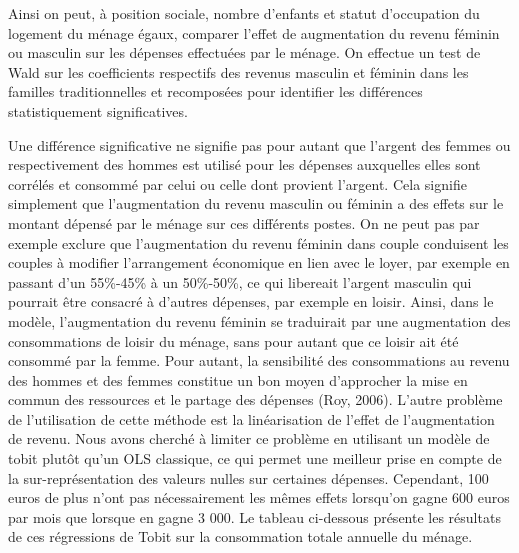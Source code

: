 \documentclass[
  12pt,
]{book}
\begin{document}
Ainsi on peut, à position sociale, nombre d'enfants et statut
d'occupation du logement du ménage égaux, comparer l'effet de
augmentation du revenu féminin ou masculin sur les dépenses effectuées
par le ménage. On effectue un test de Wald sur les coefficients
respectifs des revenus masculin et féminin dans les familles
traditionnelles et recomposées pour identifier les différences
statistiquement significatives.

Une différence significative ne signifie pas pour autant que l'argent
des femmes ou respectivement des hommes est utilisé pour les dépenses
auxquelles elles sont corrélés et consommé par celui ou celle dont
provient l'argent. Cela signifie simplement que l'augmentation du revenu
masculin ou féminin a des effets sur le montant dépensé par le ménage
sur ces différents postes. On ne peut pas par exemple exclure que
l'augmentation du revenu féminin dans couple conduisent les couples à
modifier l'arrangement économique en lien avec le loyer, par exemple en
passant d'un 55\%-45\% à un 50\%-50\%, ce qui libereait l'argent
masculin qui pourrait être consacré à d'autres dépenses, par exemple en
loisir. Ainsi, dans le modèle, l'augmentation du revenu féminin se
traduirait par une augmentation des consommations de loisir du ménage,
sans pour autant que ce loisir ait été consommé par la femme. Pour
autant, la sensibilité des consommations au revenu des hommes et des
femmes constitue un bon moyen d'approcher la mise en commun des
ressources et le partage des dépenses (Roy, 2006). L'autre problème de
l'utilisation de cette méthode est la linéarisation de l'effet de
l'augmentation de revenu. Nous avons cherché à limiter ce problème en
utilisant un modèle de tobit plutôt qu'un OLS classique, ce qui permet
une meilleur prise en compte de la sur-représentation des valeurs nulles
sur certaines dépenses. Cependant, 100 euros de plus n'ont pas
nécessairement les mêmes effets lorsqu'on gagne 600 euros par mois que
lorsque en gagne 3 000. Le tableau ci-dessous présente les résultats de
ces régressions de Tobit sur la consommation totale annuelle du ménage.
\end{document}
